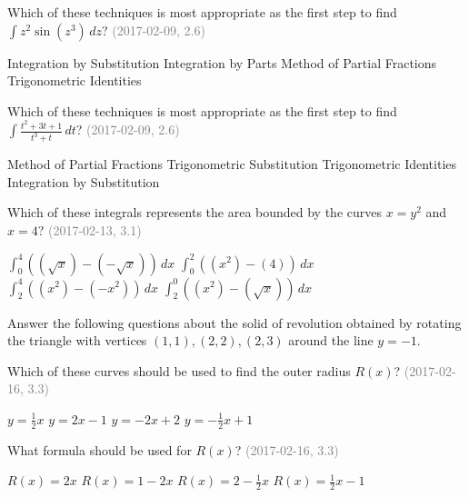 \documentclass[12pt]{exam}
\newcommand{\questionDate}[1]{\textcolor{gray}{(#1)}}
\newcommand{\<}{\langle}
\renewcommand{\>}{\rangle}
\begin{document}
\begin{questions}
  \question
  Which of these techniques is most appropriate as the first step to find
  \(\int z^2\sin(z^3)\,dz\)?
  \questionDate{2017-02-09, 2.6}
  \begin{choices}
    \CorrectChoice
      Integration by Substitution
    \choice
      Integration by Parts
    \choice
      Method of Partial Fractions
    \choice
      Trigonometric Identities
  \end{choices}

  \question
  Which of these techniques is most appropriate as the first step to find
  \(\int \frac{t^2+3t+1}{t^3+t}\,dt\)?
  \questionDate{2017-02-09, 2.6}
  \begin{choices}
    \CorrectChoice
      Method of Partial Fractions
    \choice
      Trigonometric Substitution
    \choice
      Trigonometric Identities
    \choice
      Integration by Substitution
  \end{choices}







  \newpage

  \question
  Which of these integrals
  represents the area bounded by the curves \(x=y^2\) and \(x=4\)?
  \questionDate{2017-02-13, 3.1}
  \begin{choices}
    \CorrectChoice
      \(\int_0^4((\sqrt x)-(-\sqrt x))\,dx\)
    \choice
      \(\int_0^2((x^2)-(4))\,dx\)
    \choice
      \(\int_2^4((x^2)-(-x^2))\,dx\)
    \choice
      \(\int_2^0((x^2)-(\sqrt x))\,dx\)
  \end{choices}







  \newpage

  Answer the following questions about the solid of revolution obtained by
  rotating the triangle with vertices \((1,1),(2,2),(2,3)\) around
  the line \(y=-1\).

  \question
  Which of these curves should be used to find the outer radius \(R(x)\)?
  \questionDate{2017-02-16, 3.3}
  \begin{choices}
    \choice
      \(y=\frac{1}{2}x\)
    \CorrectChoice
      \(y=2x-1\)
    \choice
      \(y=-2x+2\)
    \choice
      \(y=-\frac{1}{2}x+1\)
  \end{choices}

  \question
  What formula should be used for \(R(x)\)?
  \questionDate{2017-02-16, 3.3}
  \begin{choices}
    \CorrectChoice
      \(R(x)=2x\)
    \choice
      \(R(x)=1-2x\)
    \choice
      \(R(x)=2-\frac{1}{2}x\)
    \choice
      \(R(x)=\frac{1}{2}x-1\)
  \end{choices}


\end{questions}
\end{document}

